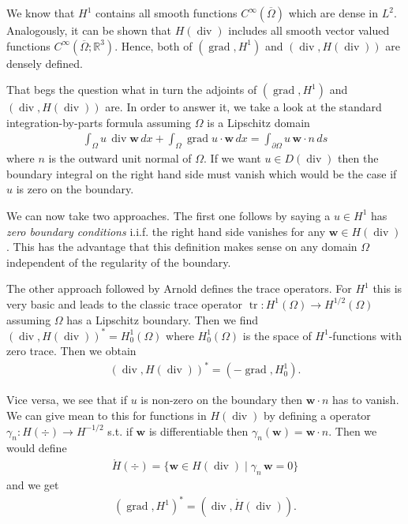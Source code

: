 \documentclass[12pt,a4paper]{article}
\numberwithin{equation}{subsection}
\numberwithin{lemma}{subsection}
\theoremstyle{definition}
\DeclareMathOperator{\diver}{div}
\DeclareMathOperator{\grad}{grad}
\DeclareMathOperator{\tr}{tr}
\newcommand{\real}{\mathbb{R}}
\begin{document}
We know that $H^1$ contains all smooth functions 
$C^\infty(\overline{\Omega})$ which are dense in $L^2$. 
Analogously, it can be shown that $H(\diver)$ includes all smooth 
vector valued functions $C^\infty(\overline{\Omega};\real^3)$. Hence, 
both of $(\grad,H^1)$ and $(\diver,H(\diver))$ are densely defined.

That begs the question what in turn the adjoints of 
$(\grad,H^1)$ and $(\diver, H(\diver))$ are. 
In order to answer it, we take a look at the standard 
integration-by-parts formula assuming $\Omega$ is a Lipschitz domain
\begin{align}
    \int_\Omega u \, \diver \mathbf{w} \, dx 
        + \int_\Omega \grad u \cdot \mathbf{w} \, dx
    = \int_{\partial \Omega} u \, \mathbf{w}\cdot n \, ds
    \label{eq:integration_by_parts}
\end{align}
where $n$ is the outward unit normal of $\Omega$. If we want 
$u \in D(\diver)$ then the boundary integral on the right hand side must 
vanish which would be the case if $u$ is zero on the boundary. 

We can now take two approaches. The first one follows \cite{picard} by 
saying a $u\in H^1$ has \textit{zero boundary conditions} 
i.i.f. the right hand side vanishes for any $\mathbf{w} \in H(\diver)$. 
This has the advantage that this 
definition makes sense on any domain $\Omega$ independent of the regularity of 
the boundary. 

The other approach followed by Arnold defines the trace operators. 
For $H^1$ this is very basic and leads to the classic trace operator 
$\tr : H^1(\Omega) \rightarrow H^{1/2}(\Omega)$ assuming $\Omega$ has a 
Lipschitz boundary. Then we find 
$(\diver, H(\diver))^* = H^1_0(\Omega)$ where $H^1_0(\Omega)$ is the 
space of $H^1$-functions with zero trace. Then we obtain 
\begin{align*}
    (\diver, H(\diver))^* = (-\grad, H^1_0).
\end{align*}

Vice versa, we see that if $u$ is non-zero on the boundary then 
$\mathbf{w}\cdot n$ has to vanish. We can give mean to this for functions 
in $H(\diver)$ by defining a operator $\gamma_n: H(\div) \rightarrow H^{-1/2}$ 
s.t. if $\mathbf{w}$ is differentiable then 
$\gamma_n(\mathbf{w}) = \mathbf{w} \cdot n$. Then we would define 
\begin{align*}
    \mathring{H}(\div) = \{ \mathbf{w} \in H(\diver) \mid \gamma_n\, \mathbf{w} 
        = 0 \}
\end{align*}
and we get
\begin{align*}
    (\grad, H^1)^* = (\diver, \mathring{H}(\diver)).
\end{align*}
\end{document}
